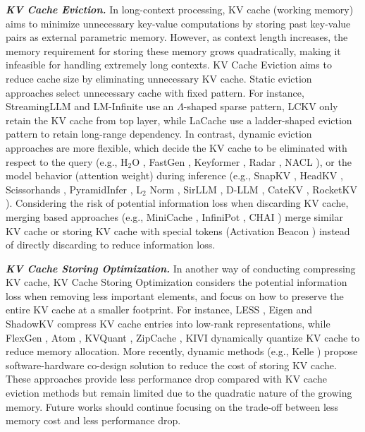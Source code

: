 \documentclass[manuscript,screen]{acmart}
\begin{document}
\textit{\textbf{KV Cache Eviction.}} In long-context processing, KV cache (working memory) aims to minimize unnecessary key-value computations by storing past key-value pairs as external parametric memory. However, as context length increases, the memory requirement for storing these memory grows quadratically, making it infeasible for handling extremely long contexts. KV Cache Eviction aims to reduce cache size by eliminating unnecessary KV cache. Static eviction approaches select unnecessary cache with fixed pattern. For instance, StreamingLLM \citep{xiao2024efficient} and LM-Infinite \citep{han-etal-2024-lm} use an $\Lambda$-shaped sparse pattern, LCKV \citep{wu-tu-2024-layer} only retain the KV cache from top layer, while LaCache \citep{shi2025lacache} use a ladder-shaped eviction pattern to retain long-range dependency. In contrast, dynamic eviction approaches are more flexible, which decide the KV cache to be eliminated with respect to the query (e.g., H$_2$O \citep{zhang2023ho}, FastGen \citep{ge2024model}, Keyformer \citep{MLSYS2024_48fecef4}, Radar \citep{hao2025radar}, NACL \citep{chen-etal-2024-nacl}), or the model behavior (attention weight) during inference (e.g., SnapKV \citep{NEURIPS2024_28ab4182}, HeadKV \citep{fu2025not}, Scissorhands \citep{liu2023scissorhands}, PyramidInfer \citep{yang-etal-2024-pyramidinfer}, L$_2$ Norm \citep{devoto-etal-2024-simple}, SirLLM \citep{yao-etal-2024-sirllm}, D-LLM \citep{NEURIPS2024_03469b1a}, CateKV \citep{jiang2025catekv}, RocketKV \citep{behnam2025rocketkv}). Considering the risk of potential information loss when discarding KV cache, merging based approaches (e.g., MiniCache \citep{NEURIPS2024_fd070571}, InfiniPot \citep{kim-etal-2024-infinipot}, CHAI \citep{pmlr-v235-agarwal24a}) merge similar KV cache or storing KV cache with special tokens (Activation Beacon \citep{zhang2025long}) instead of directly discarding to reduce information loss. 

\textit{\textbf{KV Cache Storing Optimization.}} In another way of conducting compressing KV cache, KV Cache Storing Optimization considers the potential information loss when removing less important elements, and focus on how to preserve the entire KV cache at a smaller footprint. For instance, LESS \citep{pmlr-v235-dong24f}, Eigen \citep{saxena-etal-2024-eigen} and ShadowKV \citep{sun2025shadowkv} compress KV cache entries into low-rank representations, while FlexGen \citep{10.5555/3618408.3619696}, Atom \citep{ZhaoLZYC0CK0K24}, KVQuant \citep{NEURIPS2024_028fcbcf}, ZipCache \citep{NEURIPS2024_7e57131f}, KIVI \citep{pmlr-v235-liu24bz} dynamically quantize KV cache to reduce memory allocation. More recently, dynamic methods (e.g., Kelle \citep{xia2025kellecodesignkvcaching}) propose software-hardware co-design solution to reduce the cost of storing KV cache. These approaches provide less performance drop compared with KV cache eviction methods but remain limited due to the quadratic nature of the growing memory. Future works should continue focusing on the trade-off between less memory cost and less performance drop.
\end{document}
